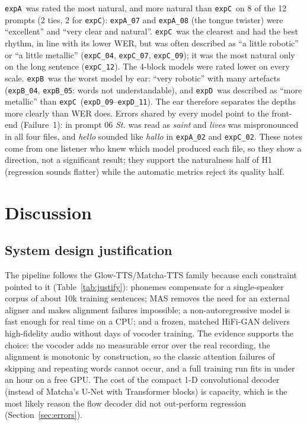 \documentclass[11pt,a4paper]{article}
\newcommand{\expA}{\texttt{expA}}
\newcommand{\expB}{\texttt{expB}}
\newcommand{\expC}{\texttt{expC}}
\newcommand{\expD}{\texttt{expD}}
\begin{document}
\noindent\expA\ was rated the most natural, and more natural than \expC\ on 8 of the 12 prompts (2 ties, 2 for \expC): \texttt{expA\_07} and \texttt{expA\_08} (the tongue twister) were ``excellent'' and ``very clear and natural''. \expC\ was the clearest and had the best rhythm, in line with its lower WER, but was often described as ``a little robotic'' or ``a little metallic'' (\texttt{expC\_04}, \texttt{expC\_07}, \texttt{expC\_09}); it was the most natural only on the long sentence (\texttt{expC\_12}). The 4-block models were rated lower on every scale. \expB\ was the worst model by ear: ``very robotic'' with many artefacts (\texttt{expB\_04}, \texttt{expB\_05}: words not understandable), and \expD\ was described as ``more metallic'' than \expC\ (\texttt{expD\_09}--\texttt{expD\_11}). The ear therefore separates the depths more clearly than WER does. Errors shared by every model point to the front-end (Failure~1): in prompt 06 \textit{St.} was read as \textit{saint} and \textit{lives} was mispronounced in all four files, and \textit{hello} sounded like \textit{hallo} in \texttt{expA\_02} and \texttt{expC\_02}. These notes come from one listener who knew which model produced each file, so they show a direction, not a significant result; they support the naturalness half of H1 (regression sounds flatter) while the automatic metrics reject its quality half.

\section{Discussion}
\subsection{System design justification}
The pipeline follows the Glow-TTS/Matcha-TTS family because each constraint pointed to it (Table~\ref{tab:justify}): phonemes compensate for a single-speaker corpus of about 10k training sentences; MAS removes the need for an external aligner and makes alignment failures impossible; a non-autoregressive model is fast enough for real time on a CPU; and a frozen, matched HiFi-GAN delivers high-fidelity audio without days of vocoder training. The evidence supports the choice: the vocoder adds no measurable error over the real recording, the alignment is monotonic by construction, so the classic attention failures of skipping and repeating words cannot occur, and a full training run fits in under an hour on a free GPU. The cost of the compact 1-D convolutional decoder (instead of Matcha's U-Net with Transformer blocks) is capacity, which is the most likely reason the flow decoder did not out-perform regression (Section~\ref{sec:errors}).
\end{document}
